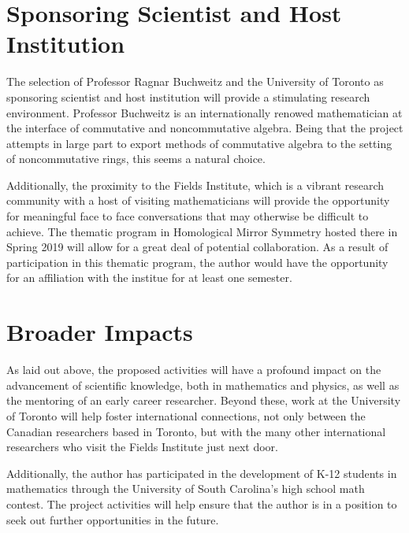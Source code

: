 \documentclass[11pt]{article}
\begin{document}
\section{Sponsoring Scientist and Host Institution}
The selection of Professor Ragnar Buchweitz and the University of Toronto as sponsoring scientist and host institution will provide a stimulating research environment.
Professor Buchweitz is an internationally renowed mathematician at the interface of commutative and noncommutative algebra.
Being that the project attempts in large part to export methods of commutative algebra to the setting of noncommutative rings, this seems a natural choice.

Additionally, the proximity to the Fields Institute, which is a vibrant research community with a host of visiting mathematicians will provide the opportunity for meaningful face to face conversations that may otherwise be difficult to achieve.
The thematic program in Homological Mirror Symmetry hosted there in Spring 2019 will allow for a great deal of potential collaboration.
As a result of participation in this thematic program, the author would have the opportunity for an affiliation with the institue for at least one semester.

\section{Broader Impacts}

As laid out above, the proposed activities will have a profound impact on the advancement of scientific knowledge, both in mathematics and physics, as well as the mentoring of an early career researcher.
Beyond these, work at the University of Toronto will help foster international connections, not only between the Canadian researchers based in Toronto, but with the many other international researchers who visit the Fields Institute just next door.

Additionally, the author has participated in the development of K-12 students in mathematics through the University of South Carolina's high school math contest.
The project activities will help ensure that the author is in a position to seek out further opportunities in the future.


\end{document}

